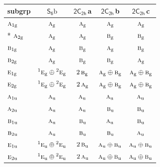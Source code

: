 \documentclass[10pt,a4paper]{article}
\numberwithin{equation}{section}
\newcommand{\grp}[1]{\mathsf{#1}}
\newcommand{\irr}[1]{\text{\normalfont\scshape #1}}
\newcommand{\conjpair}[1]{{}^{#1}}
\newcommand{\ptag}[1]{\mathrm{#1}}
\newcommand{\clsletter}[1]{\,{\scriptsize\color{black!55}#1}}
\newcommand{\secondclass}{\mathrm{b}}
\begin{document}
{\small\begin{longtable}{@{}lcccc@{}}\toprule
subgrp & \href{S6b.pdf}{$\grp{S_{6}}\secondclass$} & \href{2C2h.pdf}{$\grp{2C_{2h}}$}\clsletter{a} & \href{2C2h.pdf}{$\grp{2C_{2h}}$}\clsletter{b} & \href{2C2h.pdf}{$\grp{2C_{2h}}$}\clsletter{c}\\\midrule\endhead
\bottomrule\endfoot\endlastfoot
$\irr{a}_{1\ptag{g}}$ & $\irr{a}_{\ptag{g}}$ & $\irr{a}_{\ptag{g}}$ & $\irr{a}_{\ptag{g}}$ & $\irr{a}_{\ptag{g}}$\\*
$\irr{a}_{2\ptag{g}}$ & $\irr{a}_{\ptag{g}}$ & $\irr{a}_{\ptag{g}}$ & $\irr{b}_{\ptag{g}}$ & $\irr{b}_{\ptag{g}}$\\
$\irr{b}_{1\ptag{g}}$ & $\irr{a}_{\ptag{g}}$ & $\irr{b}_{\ptag{g}}$ & $\irr{a}_{\ptag{g}}$ & $\irr{b}_{\ptag{g}}$\\
$\irr{b}_{2\ptag{g}}$ & $\irr{a}_{\ptag{g}}$ & $\irr{b}_{\ptag{g}}$ & $\irr{b}_{\ptag{g}}$ & $\irr{a}_{\ptag{g}}$\\
$\irr{e}_{1\ptag{g}}$ & $\conjpair{1}\irr{e}_{\ptag{g}}\oplus \conjpair{2}\irr{e}_{\ptag{g}}$ & $2\,\irr{b}_{\ptag{g}}$ & $\irr{a}_{\ptag{g}}\oplus \irr{b}_{\ptag{g}}$ & $\irr{a}_{\ptag{g}}\oplus \irr{b}_{\ptag{g}}$\\
$\irr{e}_{2\ptag{g}}$ & $\conjpair{1}\irr{e}_{\ptag{g}}\oplus \conjpair{2}\irr{e}_{\ptag{g}}$ & $2\,\irr{a}_{\ptag{g}}$ & $\irr{a}_{\ptag{g}}\oplus \irr{b}_{\ptag{g}}$ & $\irr{a}_{\ptag{g}}\oplus \irr{b}_{\ptag{g}}$\\
$\irr{a}_{1\ptag{u}}$ & $\irr{a}_{\ptag{u}}$ & $\irr{a}_{\ptag{u}}$ & $\irr{a}_{\ptag{u}}$ & $\irr{a}_{\ptag{u}}$\\
$\irr{a}_{2\ptag{u}}$ & $\irr{a}_{\ptag{u}}$ & $\irr{a}_{\ptag{u}}$ & $\irr{b}_{\ptag{u}}$ & $\irr{b}_{\ptag{u}}$\\
$\irr{b}_{1\ptag{u}}$ & $\irr{a}_{\ptag{u}}$ & $\irr{b}_{\ptag{u}}$ & $\irr{a}_{\ptag{u}}$ & $\irr{b}_{\ptag{u}}$\\
$\irr{b}_{2\ptag{u}}$ & $\irr{a}_{\ptag{u}}$ & $\irr{b}_{\ptag{u}}$ & $\irr{b}_{\ptag{u}}$ & $\irr{a}_{\ptag{u}}$\\
$\irr{e}_{1\ptag{u}}$ & $\conjpair{1}\irr{e}_{\ptag{u}}\oplus \conjpair{2}\irr{e}_{\ptag{u}}$ & $2\,\irr{b}_{\ptag{u}}$ & $\irr{a}_{\ptag{u}}\oplus \irr{b}_{\ptag{u}}$ & $\irr{a}_{\ptag{u}}\oplus \irr{b}_{\ptag{u}}$\\
$\irr{e}_{2\ptag{u}}$ & $\conjpair{1}\irr{e}_{\ptag{u}}\oplus \conjpair{2}\irr{e}_{\ptag{u}}$ & $2\,\irr{a}_{\ptag{u}}$ & $\irr{a}_{\ptag{u}}\oplus \irr{b}_{\ptag{u}}$ & $\irr{a}_{\ptag{u}}\oplus \irr{b}_{\ptag{u}}$\\

\end{longtable}}
\end{document}
